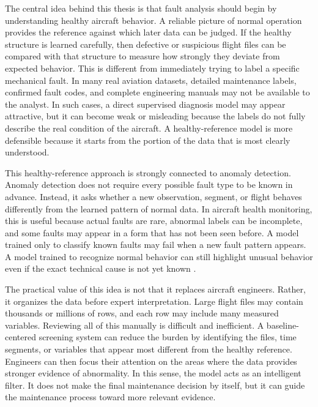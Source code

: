 \documentclass[12pt,a4paper]{report}
\begin{document}
	The central idea behind this thesis is that fault analysis should begin by understanding healthy aircraft behavior. A reliable picture of normal operation provides the reference against which later data can be judged. If the healthy structure is learned carefully, then defective or suspicious flight files can be compared with that structure to measure how strongly they deviate from expected behavior. This is different from immediately trying to label a specific mechanical fault. In many real aviation datasets, detailed maintenance labels, confirmed fault codes, and complete engineering manuals may not be available to the analyst. In such cases, a direct supervised diagnosis model may appear attractive, but it can become weak or misleading because the labels do not fully describe the real condition of the aircraft. A healthy-reference model is more defensible because it starts from the portion of the data that is most clearly understood.
	
	This healthy-reference approach is strongly connected to anomaly detection. Anomaly detection does not require every possible fault type to be known in advance. Instead, it asks whether a new observation, segment, or flight behaves differently from the learned pattern of normal data. In aircraft health monitoring, this is useful because actual faults are rare, abnormal labels can be incomplete, and some faults may appear in a form that has not been seen before. A model trained only to classify known faults may fail when a new fault pattern appears. A model trained to recognize normal behavior can still highlight unusual behavior even if the exact technical cause is not yet known \cite{chandola2009survey,zimek2012outlier,nassif2021systematic}.
	
	The practical value of this idea is not that it replaces aircraft engineers. Rather, it organizes the data before expert interpretation. Large flight files may contain thousands or millions of rows, and each row may include many measured variables. Reviewing all of this manually is difficult and inefficient. A baseline-centered screening system can reduce the burden by identifying the files, time segments, or variables that appear most different from the healthy reference. Engineers can then focus their attention on the areas where the data provides stronger evidence of abnormality. In this sense, the model acts as an intelligent filter. It does not make the final maintenance decision by itself, but it can guide the maintenance process toward more relevant evidence.
	
\end{document}
